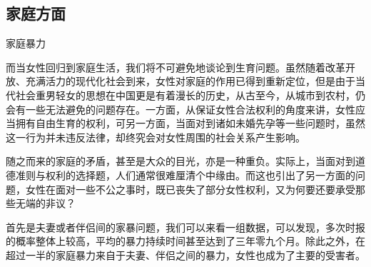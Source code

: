 \subsection{家庭方面}
\begin{frame}{家庭暴力}
    \begin{block}{}
        而当女性回归到家庭生活，我们将不可避免地谈论到生育问题。虽然随着改革开放、充满活力的现代化社会到来，女性对家庭的作用已得到重新定位，但是由于当代社会重男轻女的思想在中国更是有着漫长的历史，从古至今，从城市到农村，仍会有一些无法避免的问题存在。一方面，从保证女性合法权利的角度来讲，女性应当拥有自由生育的权利，可另一方面，当面对到诸如未婚先孕等一些问题时，虽然这一行为并未违反法律，却终究会对女性周围的社会关系产生影响。

        随之而来的家庭的矛盾，甚至是大众的目光，亦是一种重负。实际上，当面对到道德准则与权利的选择题，人们通常很难厘清个中缘由。而这也引出了另一方面的问题，女性在面对一些不公之事时，既已丧失了部分女性权利，又为何要还要承受那些无端的非议？

        首先是夫妻或者伴侣间的家暴问题，我们可以来看一组数据，可以发现，多次时报的概率整体上较高，平均的暴力持续时间甚至达到了三年零九个月。除此之外，在超过一半的家庭暴力来自于夫妻、伴侣之间的暴力，女性也成为了主要的受害者。
    \end{block}
\end{frame}


